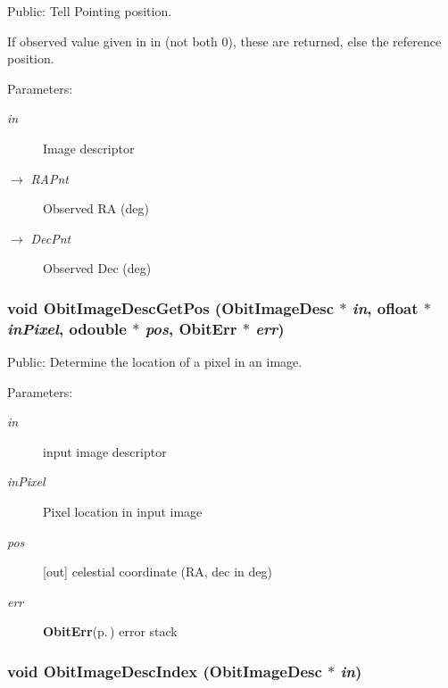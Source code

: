 Public: Tell Pointing position. 

If observed value given in in (not both 0), these are returned, else the reference position. \begin{Desc}
\item[Parameters:]
\begin{description}
\item[{\em in}]Image descriptor \item[\mbox{$\rightarrow$} {\em RAPnt}]Observed RA (deg) \item[\mbox{$\rightarrow$} {\em Dec\-Pnt}]Observed Dec (deg) \end{description}
\end{Desc}
\subsubsection{\setlength{\rightskip}{0pt plus 5cm}void Obit\-Image\-Desc\-Get\-Pos ({\bf Obit\-Image\-Desc} $\ast$ {\em in}, {\bf ofloat} $\ast$ {\em in\-Pixel}, {\bf odouble} $\ast$ {\em pos}, {\bf Obit\-Err} $\ast$ {\em err})}\label{ObitImageDesc_8c_a14}


Public: Determine the location of a pixel in an image. 

\begin{Desc}
\item[Parameters:]
\begin{description}
\item[{\em in}]input image descriptor \item[{\em in\-Pixel}]Pixel location in input image \item[{\em pos}][out] celestial coordinate (RA, dec in deg) \item[{\em err}]{\bf Obit\-Err}{\rm (p.\,\pageref{structObitErr})} error stack \end{description}
\end{Desc}
\subsubsection{\setlength{\rightskip}{0pt plus 5cm}void Obit\-Image\-Desc\-Index ({\bf Obit\-Image\-Desc} $\ast$ {\em in})}\label{ObitImageDesc_8c_a11}



